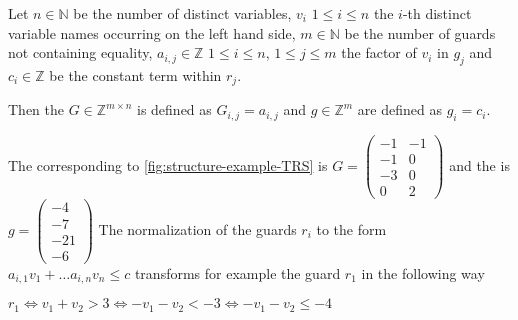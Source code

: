 \begin{definition}
	\label{def:guard}
	Let $n \in \mathbb{N}$ be the number of distinct variables, $v_i$ $1 \le i \le n$ the $i$-th distinct variable names occurring on the left hand side, $m \in \mathbb{N}$ be the number of guards not containing equality, $a_{i,j} \in \mathbb{Z}$ $1\le i \le n$, $1 \le j \le m$ the factor of $v_i$ in $g_j$ and $c_i \in \mathbb{Z}$ be the constant term within $r_j$. \newline
	
	Then the \guardmatrix $G \in \mathbb{Z}^{m\times n}$ is defined as $G_{i,j}=a_{i,j} $ and \guardconstants $g \in \mathbb{Z}^m$ are defined as $g_i = c_i$.
\end{definition}
\begin{example}
	The corresponding \guardmatrix to \autoref{fig:structure-example-TRS} is $G = \begin{pmatrix} -1 & -1 \\ -1 & 0 \\ -3 & 0 \\ 0 & 2 \end{pmatrix}$ and the \guardconstants is $g= \begin{pmatrix} -4 \\ -7 \\ -21 \\ -6 \end{pmatrix}$ \newline
	The normalization of the guards $r_i$ to the form $a_{i,1}v_1+\dots a_{i,n}v_n \le c$ transforms for example the guard $r_1$ in the following way
	\begin{center}
		$r_1 \Leftrightarrow v_1+v_2 > 3  \Leftrightarrow -v_1-v_2 < -3 \Leftrightarrow -v_1-v_2 \le -4$
	\end{center}
\end{example}

